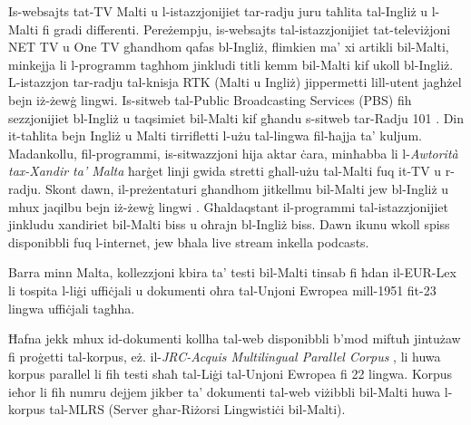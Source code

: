 \documentclass[]{../../metanetpaper}
\begin{document}
\begin{multicols}{2}
Is-websajts tat-TV Malti u l-istazzjonijiet tar-radju juru taħlita tal-Ingliż u l-Malti fi gradi differenti. Pereżempju, is-websajts tal-istazzjonijiet tat-televiżjoni NET TV \cite{NetTV1} u One TV\cite{OneTV1} għandhom qafas bl-Ingliż, flimkien ma’ xi artikli bil-Malti, minkejja li l-programm tagħhom jinkludi titli kemm bil-Malti kif ukoll bl-Ingliż. L-istazzjon tar-radju tal-knisja RTK\cite{RTK1} (Malti u Ingliż) jippermetti lill-utent jagħżel bejn iż-żewġ lingwi. Is-sitweb tal-Public Broadcasting Services (PBS) \cite{PBS1} fih sezzjonijiet bl-Ingliż u taqsimiet bil-Malti kif għandu s-sitweb tar-Radju 101 \cite{radio101}. Din it-taħlita bejn Ingliż u Malti tirrifletti l-użu tal-lingwa fil-ħajja ta’ kuljum. Madankollu, fil-programmi, is-sitwazzjoni hija aktar ċara, minħabba li l-\emph{Awtorità tax-Xandir ta’ Malta} ħarġet linji gwida stretti għall-użu tal-Malti fuq it-TV u r-radju. Skont dawn, il-preżentaturi għandhom jitkellmu bil-Malti jew bl-Ingliż u mhux jaqilbu bejn iż-żewġ lingwi \cite{Fabri:2011a}. Għaldaqstant il-programmi tal-istazzjonijiet jinkludu xandiriet bil-Malti biss u oħrajn bl-Ingliż biss. Dawn ikunu wkoll spiss disponibbli fuq l-internet, jew bħala live stream inkella podcasts.

Barra minn Malta, kollezzjoni kbira ta’ testi bil-Malti tinsab fi ħdan il-EUR-Lex\cite{EURLex1} li tospita l-liġi uffiċjali u dokumenti oħra tal-Unjoni Ewropea mill-1951 fit-23 lingwa uffiċjali tagħha.

Ħafna jekk mhux id-dokumenti kollha tal-web disponibbli b’mod miftuħ jintużaw fi proġetti tal-korpus, eż. il-\emph{JRC-Acquis Multilingual Parallel Corpus} \cite{JRC-Acquis1}, li huwa korpus parallel li fih testi sħaħ tal-Liġi tal-Unjoni Ewropea fi 22 lingwa. Korpus ieħor li fih numru dejjem jikber ta’ dokumenti tal-web viżibbli bil-Malti huwa l-korpus tal-MLRS (Server għar-Riżorsi Lingwistiċi bil-Malti)\cite{MLRS1}.
\end{multicols}

\clearpage


\end{document}
